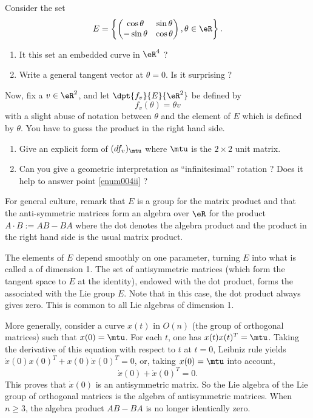 \begin{exercice}\label{exo004}
	Consider  the set
	\[
		E=\left\{
		\begin{pmatrix}
			\cos\theta  & \sin\theta \\
			-\sin\theta & \cos\theta
		\end{pmatrix},
		\theta\in\eR\right\}.
	\]


	\begin{enumerate}
		\item It this set an embedded curve in $\eR^4$ ?
		\item Write a general tangent vector at $\theta=0$. Is it surprising ? \label{enum004ii}
	\end{enumerate}

	Now, fix a $v\in\eR^2$, and let $\dpt{ f_v }{ E }{ \eR^2 }$ be defined by
	\[
		f_v(\theta)=\theta v
	\]
	with a slight abuse of notation between $\theta$ and the element of $E$ which is defined by $\theta$. You have to guess the product in the right hand side.

	\begin{enumerate}
		\item Give an explicit form of $(df_v)_{\mtu}$ where $\mtu$ is the $2\times 2$ unit matrix.
		\item Can you give a geometric interpretation as ``infinitesimal'' rotation ? Does it help to answer point \ref{enum004ii} ?
	\end{enumerate}


	For general culture, remark that $E$ is a group for the matrix product and that the anti-symmetric matrices form an algebra over $\eR$ for the product $A\cdot B:=AB-BA$ where the dot denotes the algebra product and the product in the right hand side is the usual matrix product.

	The elements of $E$ depend smoothly on one parameter, turning $E$ into what is called a  of dimension 1. The set of antisymmetric matrices (which form the tangent space to $E$ at the identity), endowed with the dot product, forms the  associated with the Lie group $E$. Note that in this case, the dot product always gives zero. This is common to all Lie algebras of dimension 1.

	More generally, consider a curve $x(t)$ in $O(n)$  (the group of orthogonal matrices) such that $x(0)=\mtu$. For each $t$, one has $x(t)x(t)^T=\mtu$. Taking the derivative of this equation with respect to $t$ at $t=0$, Leibniz rule yields  $\dot x(0)x(0)^T+x(0)\dot x(0)^T=0$, or, taking $x(0)=\mtu$ into account,
	\[
		\dot x(0)+\dot x(0)^T=0.
	\]
	This proves that $\dot x(0)$ is an antisymmetric matrix. So the Lie algebra of the Lie group of orthogonal matrices is the algebra of antisymmetric matrices. When $n\geq 3$, the algebra product $AB-BA$ is no longer identically zero.

\end{exercice}
